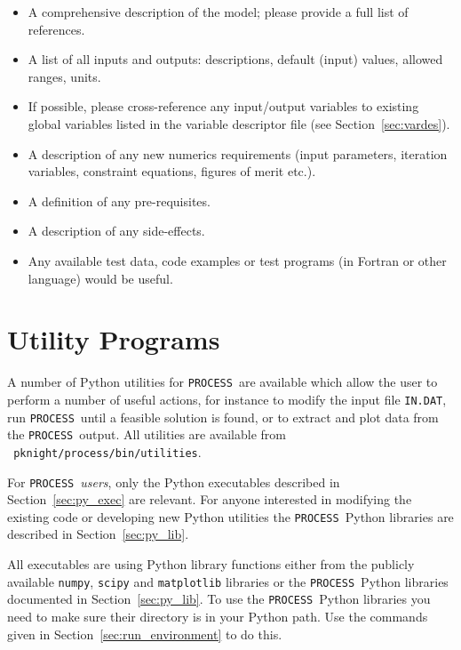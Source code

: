 \documentclass[11pt,a4paper]{report}
\newcommand{\indat}{\mbox{\texttt{IN.DAT}}}
\newcommand{\process}{\mbox{\texttt{PROCESS}}}
\newcommand{\setheader}[1]
 {\markright{\rlap{\lower0.8ex\hbox to\textwidth{\hrulefill}}{\bf#1}}}
\newcommand{\mychapter}[1]{\small\normalsize
 \setcounter{footnote}{0}
 \chapter{#1}
 \pagestyle{myheadings}
 \setheader{Chapter \thechapter\hspace{0.8em}#1}}
\begin{document}
\begin{itemize}

\item A comprehensive description of the model; please provide a full list of
  references.

\item A list of all inputs and outputs: descriptions, default (input) values,
  allowed ranges, units.

\item If possible, please cross-reference any input/output variables to
  existing global variables listed in the variable descriptor file (see
  Section~\ref{sec:vardes}).

\item A description of any new numerics requirements (input parameters,
  iteration variables, constraint equations, figures of merit etc.).

\item A definition of any pre-requisites.

\item A description of any side-effects.

\item Any available test data, code examples or test programs (in Fortran or
  other language) would be useful.

\end{itemize}


\mychapter{Utility Programs}
\label{chap:utilities}

A number of Python utilities for \process\ are available which allow the user
to perform a number of useful actions, for instance to modify the
input file \indat, run \process\ until a feasible solution is found, or to
extract and plot data from the \process\ output. All utilities are available
from \texttt{~pknight/process/bin/utilities}.

For \process\ \textit{users}, only the Python executables described in
Section~\ref{sec:py_exec} are relevant. For anyone interested in modifying the
existing code or developing new Python utilities the \process\ Python
libraries are described in Section~\ref{sec:py_lib}.

All executables are using Python library functions either from the publicly
available \texttt{numpy}, \texttt{scipy} and \texttt{matplotlib} libraries or
the \process\ Python libraries documented in Section~\ref{sec:py_lib}. To use
the \process\ Python libraries you need to make sure their directory is in
your Python path. Use the commands given in Section~\ref{sec:run_environment} to
do this.
\end{document}
